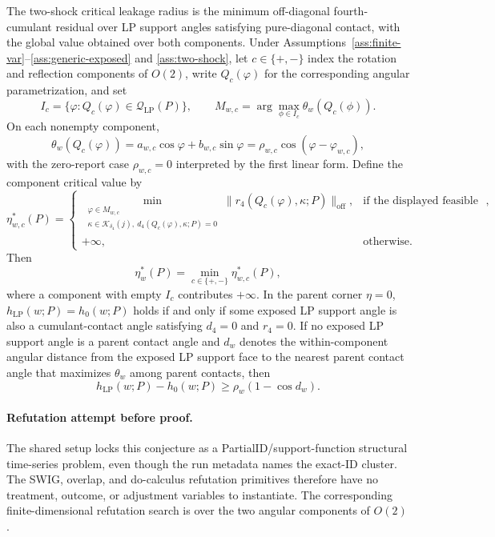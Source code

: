 \begin{theorem}\label{thm:two-shock-formula}
The two-shock critical leakage radius is the minimum off-diagonal fourth-cumulant residual over LP support angles satisfying pure-diagonal contact, with the global value obtained over both components.
Under Assumptions~\ref{ass:finite-var}--\ref{ass:generic-exposed} and \ref{ass:two-shock}, let \(c\in\{+,-\}\) index the rotation and reflection components of \(O(2)\), write \(Q_c(\varphi)\) for the corresponding angular parametrization, and set
\[
I_c=\{\varphi:Q_c(\varphi)\in\mathcal Q_{\mathrm{LP}}(P)\},
\qquad
M_{w,c}=\arg\max_{\phi\in I_c}\theta_w(Q_c(\phi)).
\]
On each nonempty component,
\[
\theta_w(Q_c(\varphi))
=a_{w,c}\cos\varphi+b_{w,c}\sin\varphi
=\rho_{w,c}\cos(\varphi-\varphi_{w,c}),
\]
with the zero-report case \(\rho_{w,c}=0\) interpreted by the first linear form.
Define the component critical value by
\[
\eta_{w,c}^*(P)=
\begin{cases}
\displaystyle
\min_{\substack{\varphi\in M_{w,c}\\
\kappa\in\mathcal K_{\delta_4}(j),\ d_4(Q_c(\varphi),\kappa;P)=0}}
\|r_4(Q_c(\varphi),\kappa;P)\|_{\mathrm{off}},
& \text{if the displayed feasible set is nonempty},\\[1.2em]
+\infty,&\text{otherwise}.
\end{cases}
\]
Then
\[
\eta_w^*(P)=\min_{c\in\{+,-\}}\eta_{w,c}^*(P),
\]
where a component with empty \(I_c\) contributes \(+\infty\).  In the parent corner \(\eta=0\), \(h_{\mathrm{LP}}(w;P)=h_0(w;P)\) holds if and only if some exposed LP support angle is also a cumulant-contact angle satisfying \(d_4=0\) and \(r_4=0\).  If no exposed LP support angle is a parent contact angle and \(d_w\) denotes the within-component angular distance from the exposed LP support face to the nearest parent contact angle that maximizes \(\theta_w\) among parent contacts, then
\[
h_{\mathrm{LP}}(w;P)-h_0(w;P)\ge \rho_w(1-\cos d_w).
\]
\end{theorem}

\paragraph{Refutation attempt before proof.}
The shared setup locks this conjecture as a PartialID/support-function structural time-series problem, even though the run metadata names the exact-ID cluster.  The SWIG, overlap, and do-calculus refutation primitives therefore have no treatment, outcome, or adjustment variables to instantiate.  The corresponding finite-dimensional refutation search is over the two angular components of \(O(2)\).


